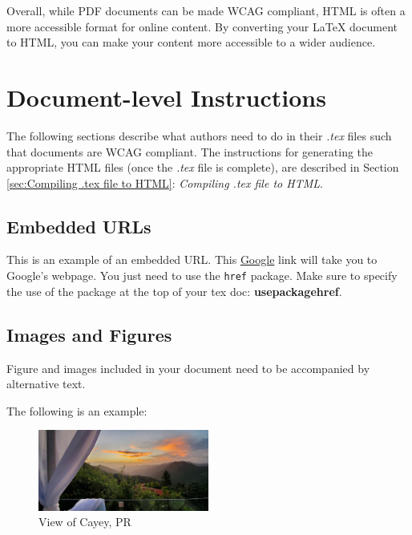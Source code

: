 \documentclass[lang=en]{article}
\newcommand{\code}[1]{\colorbox{light-gray}{\texttt{#1}}}
\begin{document}
Overall, while PDF documents can be made WCAG compliant, HTML is often a more
accessible format for online content. By converting your LaTeX document to
HTML, you can make your content more accessible to a wider audience.


\section{Document-level Instructions}

The following sections describe what authors need to do in their \textit{.tex}
files such that documents are WCAG compliant. The instructions for generating
the appropriate HTML files (once the \textit{.tex} file is complete), are
described in Section \ref{sec:Compiling .tex file to HTML}: \textit{Compiling
  .tex file to HTML}.

\subsection{Embedded URLs}

This is an example of an embedded URL. This
\href{https://www.google.com/}{Google} link will take you to Google's
webpage. You just need to use the \code{href} package. Make sure to specify the
use of the package at the top of your tex doc: \textbf{usepackage{href}}.


\subsection{Images and Figures}


Figure and images included in your document need to be accompanied by
alternative text.

The following is an example:

\begin{figure}
  \centering
  \includegraphics[width=0.5\textwidth]{figs/Cayey.jpeg}
  \captionsetup{type=figure}
  \caption[View of Cayey, PR]{View of Cayey, PR}
  \label{fig:cayey}
\end{figure}
\end{document}
